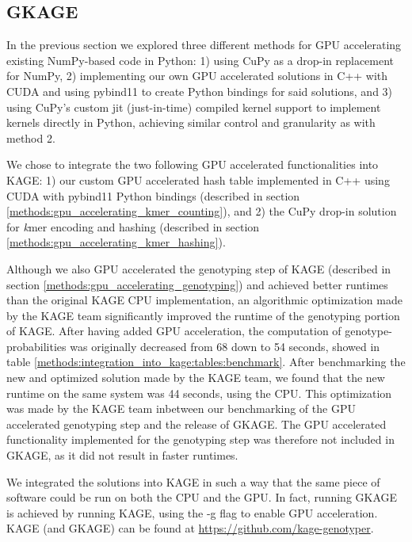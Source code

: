 \subsection{GKAGE} \label{results:gkage}
In the previous section we explored three different methods for GPU accelerating existing NumPy-based code in Python: 
1) using CuPy as a drop-in replacement for NumPy,
2) implementing our own GPU accelerated solutions in C++ with CUDA and using pybind11 to create Python bindings for said solutions, 
and 3) using CuPy's custom jit (just-in-time) compiled kernel support to implement kernels directly in Python, achieving similar control and granularity as with method 2.

We chose to integrate the two following GPU accelerated functionalities into KAGE:
1) our custom GPU accelerated hash table implemented in C++ using CUDA with pybind11 Python bindings (described in section \ref{methods:gpu_accelerating_kmer_counting}), and
2) the CuPy drop-in solution for \textit{k}mer encoding and hashing (described in section \ref{methods:gpu_accelerating_kmer_hashing}).

Although we also GPU accelerated the genotyping step of KAGE (described in section \ref{methods:gpu_accelerating_genotyping}) and achieved better runtimes than the original KAGE CPU implementation, an algorithmic optimization made by the KAGE team significantly improved the runtime of the genotyping portion of KAGE.
After having added GPU acceleration, the computation of genotype-probabilities was originally decreased from 68 down to 54 seconds, showed in table \ref{methods:integration_into_kage:tables:benchmark}.
After benchmarking the new and optimized solution made by the KAGE team, we found that the new runtime on the same system was 44 seconds, using the CPU.
This optimization was made by the KAGE team inbetween our benchmarking of the GPU accelerated genotyping step and the release of GKAGE.
The GPU accelerated functionality implemented for the genotyping step was therefore not included in GKAGE, as it did not result in faster runtimes.

We integrated the solutions into KAGE in such a way that the same piece of software could be run on both the CPU and the GPU.
In fact, running GKAGE is achieved by running KAGE, using the -g flag to enable GPU acceleration.
KAGE (and GKAGE) can be found at \url{https://github.com/kage-genotyper}.

